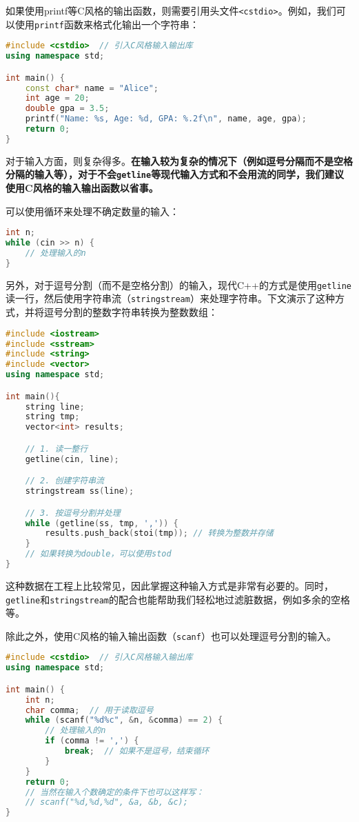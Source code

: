 \documentclass[../main.tex]{subfiles}
\begin{document}
如果使用{printf}等C风格的输出函数，则需要引用头文件\texttt{<cstdio>}。例如，我们可以使用\texttt{printf}函数来格式化输出一个字符串：
\begin{lstlisting}[language=C++]
#include <cstdio>  // 引入C风格输入输出库
using namespace std;

int main() {
    const char* name = "Alice";
    int age = 20;
    double gpa = 3.5;
    printf("Name: %s, Age: %d, GPA: %.2f\n", name, age, gpa);
    return 0;
}
\end{lstlisting}

对于输入方面，则复杂得多。{\color{red}\textbf{在输入较为复杂的情况下（例如逗号分隔而不是空格分隔的输入等），对于不会\texttt{getline}等现代输入方式和不会用流的同学，我们建议使用C风格的输入输出函数以省事。}}

可以使用循环来处理不确定数量的输入：
\begin{lstlisting}[language=C++]
int n;
while (cin >> n) {
    // 处理输入的n
}
\end{lstlisting}

另外，对于逗号分割（而不是空格分割）的输入，现代C++的方式是使用\texttt{getline}读一行，然后使用字符串流（\texttt{stringstream}）来处理字符串。下文演示了这种方式，并将逗号分割的整数字符串转换为整数数组：
\begin{lstlisting}[language=C++]
#include <iostream>
#include <sstream>
#include <string>
#include <vector>
using namespace std;

int main(){
    string line;
    string tmp;
    vector<int> results;

    // 1. 读一整行
    getline(cin, line);

    // 2. 创建字符串流
    stringstream ss(line);

    // 3. 按逗号分割并处理
    while (getline(ss, tmp, ',')) {
        results.push_back(stoi(tmp)); // 转换为整数并存储
    }
    // 如果转换为double，可以使用stod
}
\end{lstlisting}
这种数据在工程上比较常见，因此掌握这种输入方式是非常有必要的。同时，\texttt{getline}和\texttt{stringstream}的配合也能帮助我们轻松地过滤脏数据，例如多余的空格等。

除此之外，使用C风格的输入输出函数（\texttt{scanf}）也可以处理逗号分割的输入。
\begin{lstlisting}[language=C++]
#include <cstdio>  // 引入C风格输入输出库
using namespace std;

int main() {
    int n;
    char comma;  // 用于读取逗号
    while (scanf("%d%c", &n, &comma) == 2) {
        // 处理输入的n
        if (comma != ',') {
            break;  // 如果不是逗号，结束循环
        }
    }
    return 0;
    // 当然在输入个数确定的条件下也可以这样写：
    // scanf("%d,%d,%d", &a, &b, &c);
}
\end{lstlisting}
\end{document}
